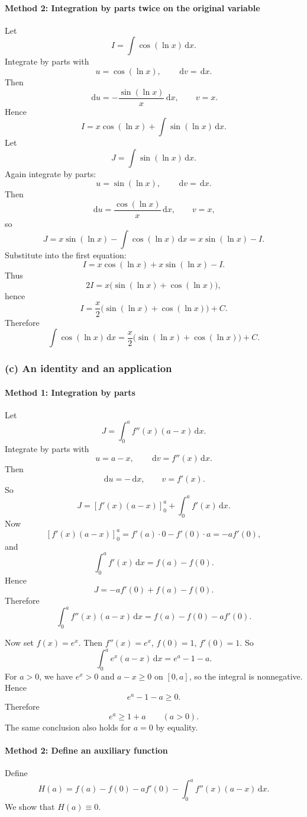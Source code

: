 \documentclass[12pt]{article}
\newcommand{\dd}{\,\mathrm{d}}
\begin{document}
\paragraph{Method 2: Integration by parts twice on the original variable}
Let
\[
I=\int \cos(\ln x)\dd x.
\]
Integrate by parts with
\[
u=\cos(\ln x),\qquad \dd v=\dd x.
\]
Then
\[
\dd u=-\frac{\sin(\ln x)}{x}\dd x,\qquad v=x.
\]
Hence
\[
I=x\cos(\ln x)+\int \sin(\ln x)\dd x.
\]
Let
\[
J=\int \sin(\ln x)\dd x.
\]
Again integrate by parts:
\[
u=\sin(\ln x),\qquad \dd v=\dd x.
\]
Then
\[
\dd u=\frac{\cos(\ln x)}{x}\dd x,\qquad v=x,
\]
so
\[
J=x\sin(\ln x)-\int \cos(\ln x)\dd x=x\sin(\ln x)-I.
\]
Substitute into the first equation:
\[
I=x\cos(\ln x)+x\sin(\ln x)-I.
\]
Thus
\[
2I=x\bigl(\sin(\ln x)+\cos(\ln x)\bigr),
\]
hence
\[
I=\frac{x}{2}\bigl(\sin(\ln x)+\cos(\ln x)\bigr)+C.
\]
Therefore
\[
\boxed{\int \cos(\ln x)\dd x=\frac{x}{2}\bigl(\sin(\ln x)+\cos(\ln x)\bigr)+C.}
\]

\bigskip

\subsubsection{(c) An identity and an application}

\paragraph{Method 1: Integration by parts}
Let
\[
J=\int_0^a f''(x)(a-x)\dd x.
\]
Integrate by parts with
\[
u=a-x,\qquad \dd v=f''(x)\dd x.
\]
Then
\[
\dd u=-\dd x,\qquad v=f'(x).
\]
So
\[
J=\left[f'(x)(a-x)\right]_0^a+\int_0^a f'(x)\dd x.
\]
Now
\[
\left[f'(x)(a-x)\right]_0^a=f'(a)\cdot 0-f'(0)\cdot a=-af'(0),
\]
and
\[
\int_0^a f'(x)\dd x=f(a)-f(0).
\]
Hence
\[
J=-af'(0)+f(a)-f(0).
\]
Therefore
\[
\boxed{\int_0^a f''(x)(a-x)\dd x=f(a)-f(0)-af'(0).}
\]

Now set \(f(x)=e^x\). Then \(f''(x)=e^x\), \(f(0)=1\), \(f'(0)=1\). So
\[
\int_0^a e^x(a-x)\dd x=e^a-1-a.
\]
For \(a>0\), we have \(e^x>0\) and \(a-x\ge 0\) on \([0,a]\), so the integral is nonnegative. Hence
\[
e^a-1-a\ge 0.
\]
Therefore
\[
\boxed{e^a\ge 1+a \qquad (a>0).}
\]
The same conclusion also holds for \(a=0\) by equality.

\paragraph{Method 2: Define an auxiliary function}
Define
\[
H(a)=f(a)-f(0)-af'(0)-\int_0^a f''(x)(a-x)\dd x.
\]
We show that \(H(a)\equiv 0\).
\end{document}
